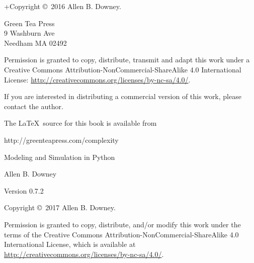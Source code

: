 \documentclass[12pt]{book}
\newcommand{\thetitle}{Modeling and Simulation in Python}
\newcommand{\theauthors}{Allen B. Downey}
\newcommand{\theversion}{0.7.2}
\theoremstyle{exercise}
\begin{document}
\begin{latexonly}
\begin{flushright}
\end{flushright}


\pagebreak
\thispagestyle{empty}

+Copyright \copyright ~2016 \theauthors.



\vspace{0.2in}

\begin{flushleft}
Green Tea Press       \\
9 Washburn Ave \\
Needham MA 02492
\end{flushleft}

Permission is granted to copy, distribute, transmit and adapt this work under a Creative Commons Attribution-NonCommercial-ShareAlike 4.0 International License: \url{http://creativecommons.org/licenses/by-nc-sa/4.0/}.

If you are interested in distributing a commercial version of this
work, please contact the author.

The \LaTeX\ source for this book is available from

\begin{code}
      http://greenteapress.com/complexity
\end{code}


\cleardoublepage
\setcounter{tocdepth}{1}
\tableofcontents

\end{latexonly}



\begin{htmlonly}

\vspace{1em}

{\Large \thetitle}

{\large \theauthors}

Version \theversion

\vspace{1em}

Copyright \copyright ~2017 \theauthors.

Permission is granted to copy, distribute, and/or modify this work
under the terms of the Creative Commons
Attribution-NonCommercial-ShareAlike 4.0 International License, which is
available at \url{http://creativecommons.org/licenses/by-nc-sa/4.0/}.

\vspace{1em}

\setcounter{chapter}{-1}

\end{htmlonly}
\end{document}
